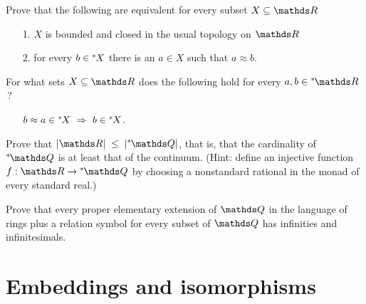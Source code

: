 \begin{exercise}\label{ex_bclosed_nstd}
  Prove that the following are equivalent for every subset $X\subseteq\RR$\nobreak
  \begin{itemize}
  \item[1.]  $X$ is bounded and closed in the usual topology on $\RR$
  \item[2.]  for every $b\in {}^*\kern-.2ex X$ there is an $a\in X$ such that $a\approx b$.
  \end{itemize}
\end{exercise}

\begin{exercise}\label{ex_clopen_nstd}
  For what sets $X \subseteq \RR$ does the following hold for every $a,b\in\nsR$\,?
  \begin{itemize}
  \item[] $b\approx a\in\ns X \ \IMP\ b\in\ns X$.
  \end{itemize}
\end{exercise}

\begin{exercise}\label{ex_card_nstd}
  Prove that $|\RR|\;\le\;|\nsQ|$, that is, that the cardinality of $\nsQ$ is at least that of the continuum.
  (Hint: define an injective function $f:\RR\to\nsQ$ by choosing a nonstandard rational in the monad of every standard real.) 
\end{exercise}

\begin{exercise}\label{ex_Q_nstd}
  Prove that every proper elementary extension of $\QQ$ in the language of rings plus a relation symbol for every subset of $\QQ$ has infinities and infinitesimals.
\end{exercise}


\section{Embeddings and isomorphisms}\label{Embeddings and isomorphisms}

\def\ceq#1#2#3{\parbox[b]{18ex}{$\displaystyle #1$}\parbox[b]{6ex}{\hfil$#2$}$\displaystyle #3$}

